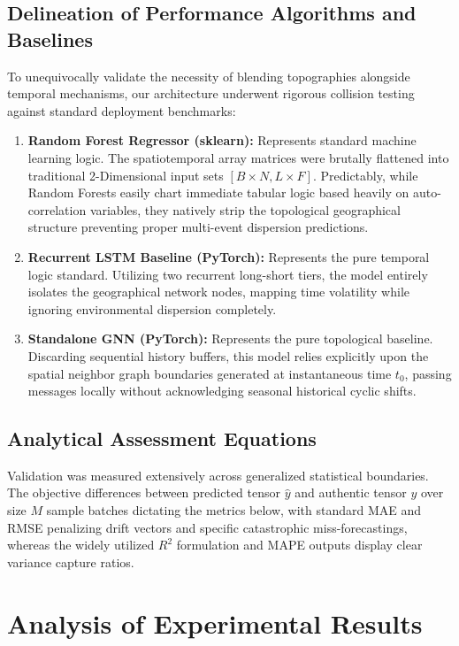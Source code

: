 \documentclass[journal,10pt,twocolumn]{IEEEtran}
\begin{document}
\subsection{Delineation of Performance Algorithms and Baselines}
To unequivocally validate the necessity of blending topographies alongside temporal mechanisms, our architecture underwent rigorous collision testing against standard deployment benchmarks:
\begin{enumerate}
    \item \textbf{Random Forest Regressor (sklearn):} Represents standard machine learning logic. The spatiotemporal array matrices were brutally flattened into traditional 2-Dimensional input sets $[B \times N, L \times F]$. Predictably, while Random Forests easily chart immediate tabular logic based heavily on auto-correlation variables, they natively strip the topological geographical structure preventing proper multi-event dispersion predictions.
    \item \textbf{Recurrent LSTM Baseline (PyTorch):} Represents the pure temporal logic standard. Utilizing two recurrent long-short tiers, the model entirely isolates the geographical network nodes, mapping time volatility while ignoring environmental dispersion completely.
    \item \textbf{Standalone GNN (PyTorch):} Represents the pure topological baseline. Discarding sequential history buffers, this model relies explicitly upon the spatial neighbor graph boundaries generated at instantaneous time $t_0$, passing messages locally without acknowledging seasonal historical cyclic shifts.
\end{enumerate}

\subsection{Analytical Assessment Equations}
Validation was measured extensively across generalized statistical boundaries. The objective differences between predicted tensor $\hat{y}$ and authentic tensor $y$ over size $M$ sample batches dictating the metrics below, with standard MAE and RMSE penalizing drift vectors and specific catastrophic miss-forecastings, whereas the widely utilized $R^2$ formulation and MAPE outputs display clear variance capture ratios.

\section{Analysis of Experimental Results}
\end{document}

